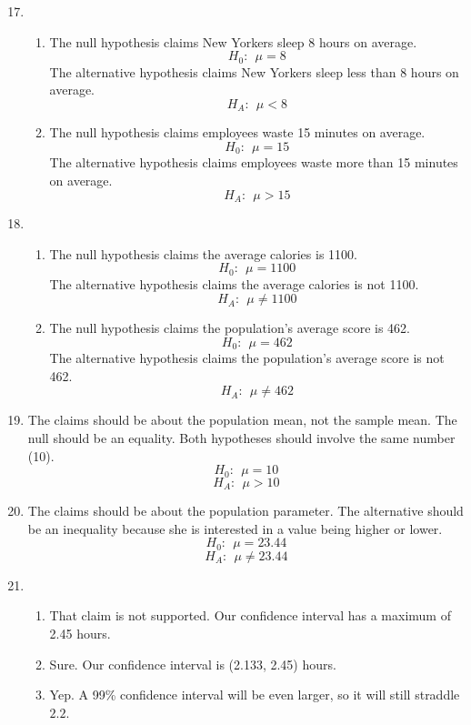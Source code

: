 \documentclass[12pt,letterpaper]{article}
\begin{document}
\newcommand{\N}[2]{\mathcal{N}\big(#1,~#2\big)}
\newcommand{\Geo}[1]{\texttt{Geo}\big(#1\big)}
\newcommand{\B}[2]{\mathcal{B}\big(#1,~#2\big)}
\newcommand{\AND}{\textsc{~and~}}
\newcommand{\OR}{\textsc{~or~}}
\newcommand{\zs}{z^{\star}}

\begin{enumerate}
\setcounter{enumi}{16}

\item \begin{enumerate}
\item The null hypothesis claims New Yorkers sleep 8 hours on average. 
$$H_0: ~~\mu = 8 $$
The alternative hypothesis claims New Yorkers sleep less than 8 hours on average.
$$H_A: ~~\mu < 8 $$
\item The null hypothesis claims employees waste 15 minutes on average.
$$H_0: ~~\mu=15 $$
The alternative hypothesis claims employees waste more than 15 minutes on average.
$$H_A: ~~\mu > 15 $$
\end{enumerate}

\item \begin{enumerate}
\item The null hypothesis claims the average calories is 1100.
$$H_0: ~~\mu = 1100 $$
The alternative hypothesis claims the average calories is not 1100.
$$H_A: ~~\mu \ne 1100 $$
\item The null hypothesis claims the population's average score is 462.
$$H_0: ~~\mu=462 $$
The alternative hypothesis claims the population's average score is not 462.
$$H_A: ~~\mu \ne 462 $$
\end{enumerate}

\item The claims should be about the population mean, not the sample mean. The null should be an equality. Both hypotheses should involve the same number (10).
$$H_0:~~\mu = 10 $$
$$H_A:~~\mu > 10 $$

\item The claims should be about the population parameter. The alternative should be an inequality because she is interested in a value being higher or lower.
$$H_0:~~\mu = 23.44 $$
$$H_A:~~\mu \ne 23.44 $$

\item \begin{enumerate}
\item That claim is not supported. Our confidence interval has a maximum of 2.45 hours.
\item Sure. Our confidence interval is (2.133, 2.45) hours.
\item Yep. A 99\% confidence interval will be even larger, so it will still straddle $2.2$.
\end{enumerate}



\end{enumerate}
\end{document}
